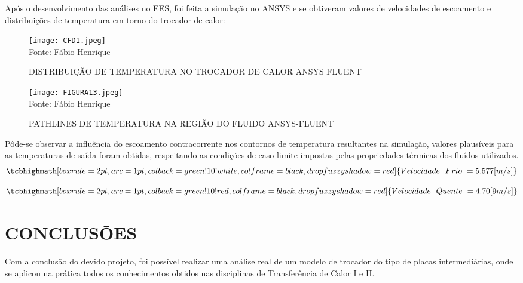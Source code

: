 \documentclass[a4paper,12pt,oneside]{article}
\begin{document}
\begin{flushright}
\pagebreak
\clearpage
\newpage

Após o desenvolvimento das análises no EES, foi feita a simulação no ANSYS e se obtiveram valores de velocidades de escoamento e distribuições de temperatura em torno do trocador de calor:\\

\begin{figure}[h]
	\centering
	\caption{DISTRIBUIÇÃO DE TEMPERATURA NO TROCADOR DE CALOR  ANSYS FLUENT}
	\vspace{0.5cm}
	\texttt{[image: CFD1.jpeg]}
	\vspace{0.5cm}\\
	Fonte: Fábio Henrique
\end{figure}
\pagebreak
\clearpage
\newpage
\begin{figure}[h]
	\centering
	\caption{PATHLINES DE TEMPERATURA NA REGIÃO DO FLUIDO ANSYS-FLUENT}
	\vspace{0.5cm}
	\texttt{[image: FIGURA13.jpeg]}
	\vspace{0.5cm}\\
	Fonte: Fábio Henrique
\end{figure}
\pagebreak
\clearpage
\newpage
Pôde-se observar a influência do escoamento contracorrente nos contornos de temperatura resultantes na simulação, valores plausíveis para as temperaturas de saída foram obtidas, respeitando as condições de caso limite impostas pelas propriedades térmicas dos fluídos utilizados.\\

\begin{equation}
\tcbhighmath[boxrule=2pt,arc=1pt,colback=green!10!white,colframe=black,
drop fuzzy shadow=red]{Velocidade\,\,\,\,Frio\,\, = 5.577[m/s]}
\end{equation}
\vspace{0.5cm}

\begin{equation}
\tcbhighmath[boxrule=2pt,arc=1pt,colback=green!10!red,colframe=black,
drop fuzzy shadow=red]{Velocidade\,\,\,\,Quente\,\, = 4.70 [9m/s]}
\end{equation}
\vspace{0.5cm}
\pagebreak
\clearpage
\newpage
\section{\large CONCLUSÕES}
\vspace{0.5cm}

Com a conclusão do devido projeto, foi possível realizar uma análise real de um modelo de trocador do tipo de placas intermediárias, onde se aplicou na prática todos os conhecimentos obtidos nas disciplinas de Transferência de Calor I e II. 


\end{flushright}
\end{document}
